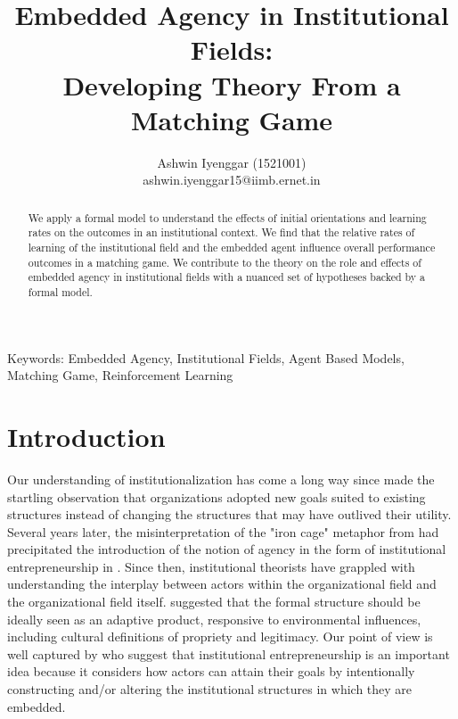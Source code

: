 \documentclass[12pt]{article}
\begin{document}
\title{Embedded Agency in Institutional Fields:\\  Developing Theory From a Matching Game}
\author{Ashwin Iyenggar  (1521001) \\ ashwin.iyenggar15@iimb.ernet.in} 

\maketitle

\begin{abstract}
We apply a formal model to understand the effects of initial orientations and learning rates on the outcomes in an institutional context. We find that the relative rates of learning of the institutional field and the embedded agent influence overall performance outcomes in a matching game. We contribute to the theory on the role and effects of embedded agency in institutional fields with a nuanced set of hypotheses backed by a formal model.
\end{abstract}


{Keywords:} Embedded Agency, Institutional Fields, Agent Based Models, Matching Game, Reinforcement Learning

\section{Introduction}\label{S:Introduction}
Our understanding of  institutionalization has come a long way since \cite{Selznick1957} made the startling observation that organizations adopted new goals suited to existing structures  instead of changing the structures that may have outlived their utility. Several years later, the misinterpretation of the "iron cage" metaphor from  \cite{Dimaggio1983} had precipitated the introduction of the notion of agency in the form of institutional entrepreneurship in \cite{Dimaggio1988}. Since then, institutional theorists have grappled with understanding the interplay between  actors within the organizational field and the organizational field itself.  \cite{Selznick1996} suggested that the formal structure should be ideally seen as an adaptive product, responsive to environmental influences, including cultural definitions of propriety and legitimacy. Our point of view is well captured by \cite{Philips2009} who suggest that institutional entrepreneurship is an important idea because it considers how actors can attain their goals by intentionally constructing and/or altering the institutional structures in which they are embedded. \\\\
\end{document}
